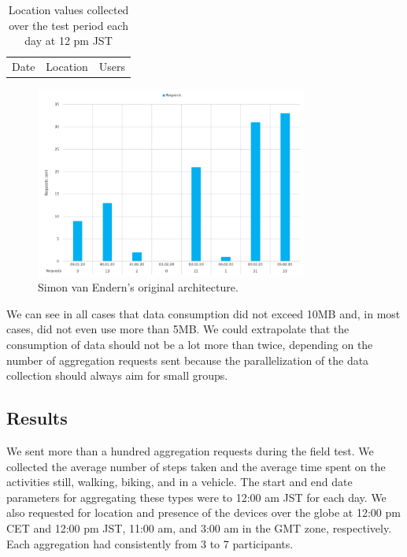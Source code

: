 \begin{table}[htbp]
	\centering
	\begin{tabular}{|c c c|} 
		\hline
		Date & Location & Users\\ [0.5ex] 
	
	\end{tabular}
	\caption{Location values collected over the test period each day at 12 pm JST}
	\label{tab:location_jst}
\end{table}


\begin{figure}[htbp]
  \centering
  \includegraphics[width=0.8\textwidth]{figures/diagram_requests.png}
  \caption{Simon van Endern's original architecture.} \label{fig:diagram_requests}
\end{figure}

We can see in all cases that data consumption did not exceed 10MB and, in most cases, did not even use more than 5MB. We could extrapolate that the consumption of data should not be a lot more than twice, depending on the number of aggregation requests sent because the parallelization of the data collection should always aim for small groups.

\subsection{Results}
We sent more than a hundred aggregation requests during the field test. We collected the average number of steps taken and the average time spent on the activities still, walking, biking, and in a vehicle. The start and end date parameters for aggregating these types were to 12:00 am JST for each day. We also requested for location and presence of the devices over the globe at 12:00 pm CET and 12:00 pm JST, 11:00 am, and 3:00 am in the GMT zone, respectively. Each aggregation had consistently from 3 to 7 participants.

